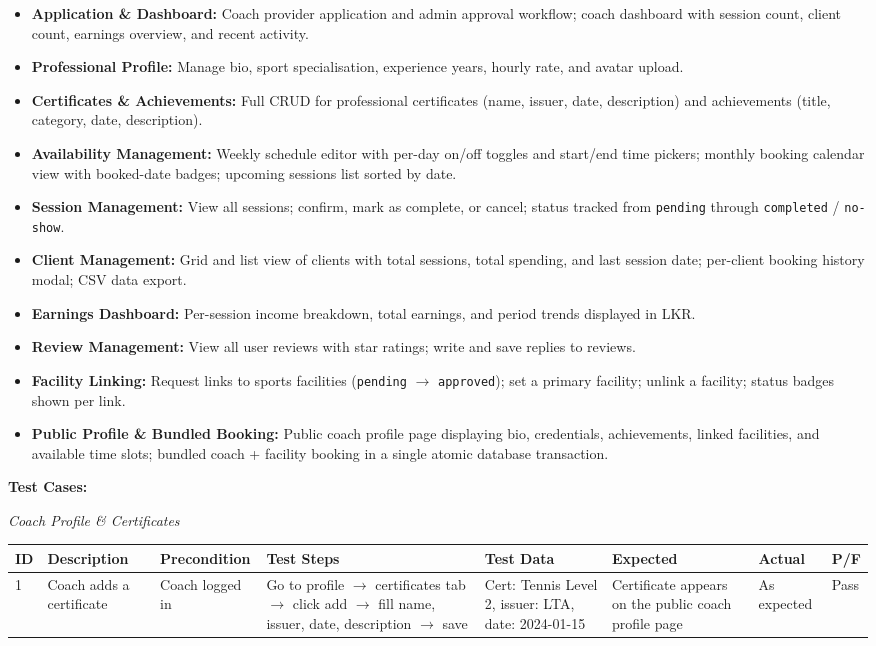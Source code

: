 \documentclass[12pt,a4paper]{report}
\begin{document}
\begin{itemize}[leftmargin=1.5cm]
  \item \textbf{Application \& Dashboard:} Coach provider application and admin approval workflow; coach dashboard with session count, client count, earnings overview, and recent activity.
  \item \textbf{Professional Profile:} Manage bio, sport specialisation, experience years, hourly rate, and avatar upload.
  \item \textbf{Certificates \& Achievements:} Full CRUD for professional certificates (name, issuer, date, description) and achievements (title, category, date, description).
  \item \textbf{Availability Management:} Weekly schedule editor with per-day on/off toggles and start/end time pickers; monthly booking calendar view with booked-date badges; upcoming sessions list sorted by date.
  \item \textbf{Session Management:} View all sessions; confirm, mark as complete, or cancel; status tracked from \texttt{pending} through \texttt{completed} / \texttt{no-show}.
  \item \textbf{Client Management:} Grid and list view of clients with total sessions, total spending, and last session date; per-client booking history modal; CSV data export.
  \item \textbf{Earnings Dashboard:} Per-session income breakdown, total earnings, and period trends displayed in LKR.
  \item \textbf{Review Management:} View all user reviews with star ratings; write and save replies to reviews.
  \item \textbf{Facility Linking:} Request links to sports facilities (\texttt{pending} $\to$ \texttt{approved}); set a primary facility; unlink a facility; status badges shown per link.
  \item \textbf{Public Profile \& Bundled Booking:} Public coach profile page displaying bio, credentials, achievements, linked facilities, and available time slots; bundled coach + facility booking in a single atomic database transaction.
\end{itemize}

\textbf{Test Cases:}

\textit{Coach Profile \& Certificates}

\begin{center}
\footnotesize
\begin{longtable}{p{0.4cm} p{2.2cm} p{1.8cm} p{3.2cm} p{2.2cm} p{2.2cm} p{1.4cm} p{0.8cm}}
\toprule
\textbf{ID} & \textbf{Description} & \textbf{Precondition} & \textbf{Test Steps} & \textbf{Test Data} & \textbf{Expected} & \textbf{Actual} & \textbf{P/F}\\
\midrule
\endhead
1 & Coach adds a certificate & Coach logged in & Go to profile $\to$ certificates tab $\to$ click add $\to$ fill name, issuer, date, description $\to$ save & Cert: Tennis Level 2, issuer: LTA, date: 2024-01-15 & Certificate appears on the public coach profile page & As expected & Pass\\
\bottomrule
\end{longtable}
\end{center}
\end{document}

